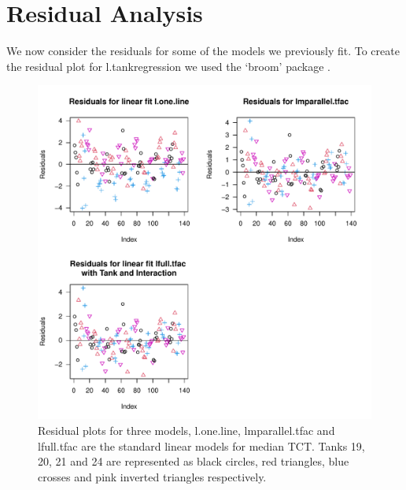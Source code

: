 \section{Residual Analysis}

We now consider the residuals for some of the models we previously fit. To create the residual plot for l.tankregression we used the `broom' package \citep{broom}.


\begin{figure}[H]
\includegraphics[scale=0.9]{Chapter3Images/residuals2.pdf}
\caption{ \hspace{1mm} Residual plots for three models, l.one.line, lmparallel.tfac and lfull.tfac are the standard linear models for median TCT. Tanks 19, 20, 21 and 24 are represented as black circles, red triangles, blue crosses and pink inverted triangles respectively. }
\label{lab:resid2}
\end{figure}



